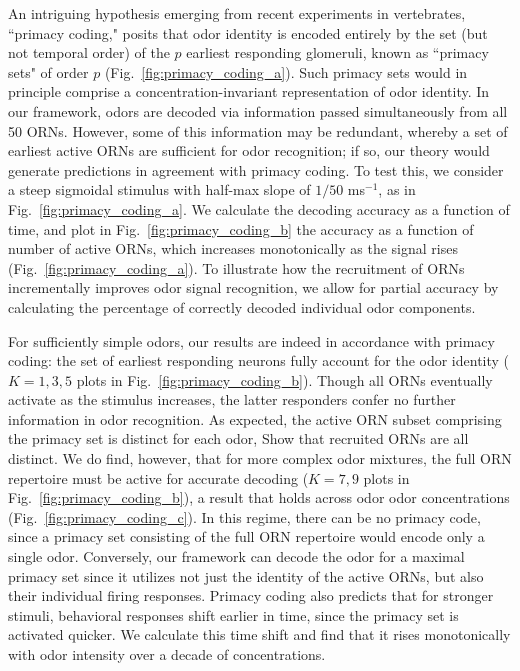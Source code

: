 \documentclass[9pt,twocolumn,twoside,lineno]{pnas-new}
\begin{document}
An intriguing hypothesis emerging from recent experiments in vertebrates, ``primacy coding,"  posits that odor identity is encoded entirely by the set (but not temporal order) of the $p$ earliest responding glomeruli, known as ``primacy sets" of order $p$ (Fig.~\ref{fig:primacy_coding_a}). %
Such primacy sets would in principle comprise a concentration-invariant representation of odor identity. In our framework, odors are decoded via information passed simultaneously from all 50 ORNs. However, some of this information may be redundant, whereby a set of earliest active ORNs are sufficient for odor recognition; if so, our theory would generate predictions in agreement with primacy coding. To test this, we consider a steep sigmoidal stimulus with half-max slope of $1/50$ ms$^{-1}$, as in Fig.~\ref{fig:primacy_coding_a}. We calculate the decoding accuracy as a function of time, and plot in Fig.~\ref{fig:primacy_coding_b} the accuracy as a function of number of active ORNs, which increases monotonically as the signal rises (Fig.~\ref{fig:primacy_coding_a}). To illustrate how the recruitment of ORNs incrementally improves odor signal recognition, we allow for partial accuracy by calculating  the percentage of correctly decoded individual odor components.

For sufficiently simple odors, our results are indeed in accordance with primacy coding: the set of earliest responding neurons fully account for the odor identity ($K=1, 3, 5$ plots in Fig.~\ref{fig:primacy_coding_b}). Though all ORNs eventually activate as the stimulus increases, the latter responders confer no further information in odor recognition. As expected, the active ORN subset comprising the primacy set is distinct for each odor,   {\color{blue} Show that recruited ORNs are all distinct}. We do find, however, that for more complex odor mixtures, the full ORN repertoire must be active for  accurate decoding ($K=7, 9$ plots in Fig.~\ref{fig:primacy_coding_b}), a result that holds across odor  odor concentrations (Fig.~\ref{fig:primacy_coding_c}). In this regime, there can  be no primacy code, since a primacy set consisting of the full ORN repertoire would encode only a single odor. Conversely, our framework can decode the odor for a maximal primacy set since it utilizes not just the identity of the active ORNs, but also their individual firing responses. Primacy coding also predicts that for stronger stimuli, behavioral responses shift earlier in time, since the primacy set is activated quicker. We calculate this time shift and find that it rises monotonically with odor intensity over a decade of concentrations.  %
\end{document}
